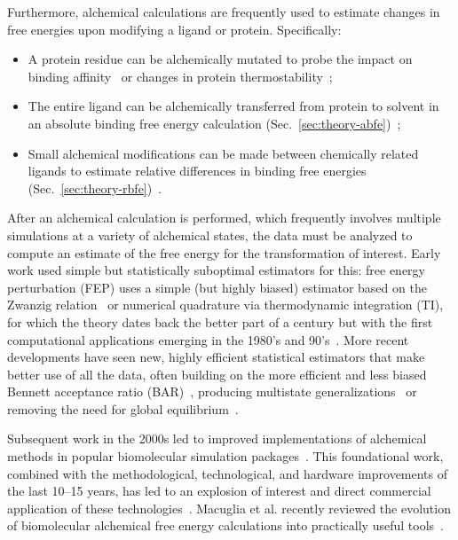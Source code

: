 \documentclass[9pt,bestpractices]{livecoms}
\begin{document}
Furthermore, alchemical calculations are frequently used to estimate changes in free energies upon modifying a ligand or protein. Specifically:
\begin{itemize}
\item A protein residue can be alchemically mutated to probe the impact on binding affinity~\cite{hauser2018predicting,aldeghi2018accurate} or changes in protein thermostability~\cite{seeliger2010protein,gapsys2016insights,gapsys2016accurate,aldeghi2019accurate}; 
\item The entire ligand can be alchemically transferred from protein to solvent in an absolute binding free energy calculation (Sec.~\ref{sec:theory-abfe})~\cite{mobley2007predicting,aldeghi2015accurate,aldeghi2017predictions}; 
\item Small alchemical modifications can be made between chemically related ligands to estimate relative differences in binding free energies (Sec.~\ref{sec:theory-rbfe})~\cite{wang2015accurate,mey2016blinded,song2019using,gapsys2020large,kuhn2020assessment}.
\end{itemize}


After an alchemical calculation is performed, which frequently involves multiple simulations at a variety of alchemical states, the data must be analyzed to compute an estimate of the free energy for the transformation of interest.
Early work used simple but statistically suboptimal estimators for this: free energy perturbation (FEP) uses a simple (but highly biased) estimator based on the Zwanzig relation~\cite{zwanzig1954hightemperature} or numerical quadrature via thermodynamic integration (TI), for which the theory dates back the better part of a century but with the first computational applications emerging in the 1980's and 90's~\cite{kirkwood1935statistical, jorgensen1985monte, kollman1993free, wong1986dynamics, merz1989free}. %
More recent developments have seen new, highly efficient statistical estimators that make better use of all the data, often building on the more efficient and less biased Bennett acceptance ratio (BAR)~\cite{bennett1976efficient}, producing multistate generalizations~\cite{shirts2008statisticallya} or removing the need for global equilibrium~\cite{wu2016multiensemble, mey2014xtram, wu2014statistically}.

Subsequent work in the 2000s led to improved implementations of alchemical methods in popular biomolecular simulation packages~\cite{shirts2003extremely,shirts2005solvation,vanderspoel2005gromacs, mermelstein2018fast, wang2015accurate, hedges2019biosimspace, riniker2011calculation}. 
This foundational work, combined with the methodological, technological, and hardware improvements of the last 10--15 years, has led to an explosion of interest and direct commercial application of these technologies~\cite{wang2015accurate, fratev2019improved, schindler2020largescale, cournia2017relative, sherborne2016collaborating, kuhn2020assessment}. Macuglia et al. recently reviewed the evolution of biomolecular alchemical free energy calculations into practically useful tools~\cite{macuglia2025dawn}.
\end{document}
